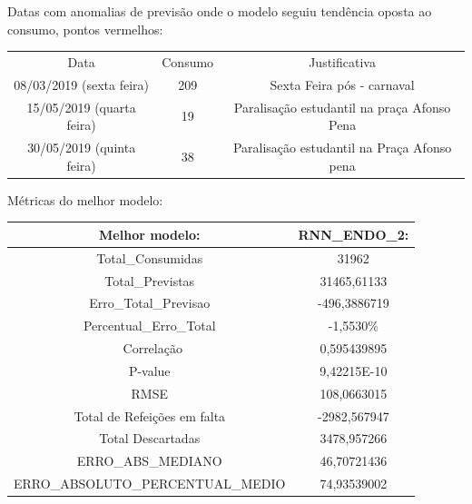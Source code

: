 \documentclass[	12pt, Times, openright, twoside, a4paper, english, brazil]{abntex2}
\begin{document}
            Datas com anomalias de previsão onde o modelo seguiu tendência oposta ao consumo, pontos vermelhos:
            
                 \begin{tabular}{|c|c|c|}
                 \rowcolor{gray!50}
                 \hline
            Data & Consumo & Justificativa \\
            08/03/2019 (sexta feira)   & 209 &Sexta Feira pós - carnaval\\
           15/05/2019 (quarta feira)   & 19  & Paralisação estudantil na praça Afonso Pena\\
            30/05/2019 (quinta feira)   &  38  & Paralisação estudantil na Praça Afonso pena\\
            \hline \end{tabular}

            Métricas do melhor modelo: 
            
                    \begin{tabular}{|c|c|}
                    \rowcolor{gray!50}
                    \hline
                    Melhor modelo: &   RNN\_ENDO\_2: \\ \hline
            Total\_Consumidas & 31962 \\ 
            Total\_Previstas & 31465,61133 \\
            Erro\_Total\_Previsao & -496,3886719 \\
            Percentual\_Erro\_Total & -1,5530\% \\\
            Correlação & 0,595439895 \\
            P-value & 9,42215E-10    \\
             RMSE &  108,0663015\\
            Total de Refeições em falta & -2982,567947 \\Total Descartadas & 3478,957266\\
            ERRO\_ABS\_MEDIANO & 46,70721436 \\ ERRO\_ABSOLUTO\_PERCENTUAL\_MEDIO & 74,93539002 \\ \hline \end{tabular}
            
\end{document}
